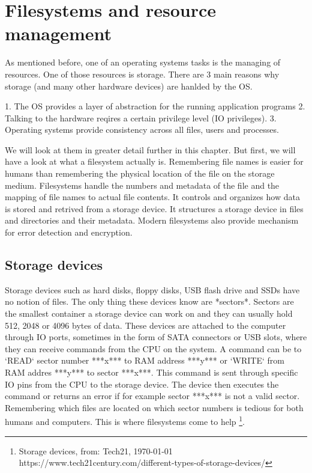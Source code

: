 \section{Filesystems and resource management}

As mentioned before, one of an operating systems tasks is the managing of resources.
One of those resources is storage. There are 3 main reasons why storage (and many other
hardware devices) are hanlded by the OS.

1. The OS provides a layer of abstraction for the running application programs
2. Talking to the hardware reqires a certain privilege level (IO privileges).
3. Operating systems provide consistency across all files, users and processes.

We will look at them in greater detail further in this chapter.
But first, we will have a look at what a filesystem actually is. Remembering file names is easier for
humans than remembering the physical location of the file on the storage medium. Filesystems handle
the numbers and metadata of the file and the mapping of file names to actual file contents. It
controls and organizes how data is stored and retrived from a storage device. It structures a storage
device in files and directories and their metadata. Modern filesystems also provide mechanism for
error detection and encryption.

\subsection{Storage devices}

Storage devices such as hard disks, floppy disks, USB flash drive and SSDs have no notion of files.
The only thing these devices know are *sectors*. Sectors are the smallest container a storage device
can work on and they can usually hold 512, 2048 or 4096 bytes of data. These devices are attached to
the computer through IO ports, sometimes in the form of SATA connectors or USB slots, where they can
receive commands from the CPU on the system. A command can be to `READ` sector number ***x*** to RAM
address ***y*** or `WRITE` from RAM addres ***y*** to sector ***x***. This command is sent through
specific IO pins from the CPU to the storage device. The device then executes the command or returns
an error if for example sector ***x*** is not a valid sector. Remembering which files are located on
which sector numbers is tedious for both humans and computers. This is where filesystems come to help
\footnote{Storage devices, from: Tech21, \today  \\ https://www.tech21century.com/different-types-of-storage-devices/}.

